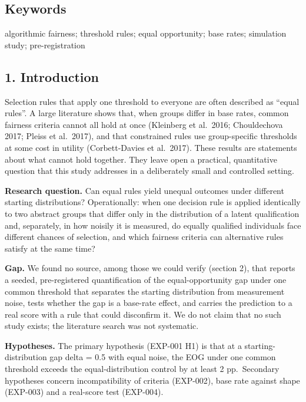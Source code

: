 \documentclass[
]{article}
\begin{document}
\subsection{Keywords}\label{keywords}

algorithmic fairness; threshold rules; equal opportunity; base rates;
simulation study; pre-registration

\subsection{1. Introduction}\label{introduction}

Selection rules that apply one threshold to everyone are often described
as ``equal rules''. A large literature shows that, when groups differ in
base rates, common fairness criteria cannot all hold at once (Kleinberg
et al.~2016; Chouldechova 2017; Pleiss et al.~2017), and that
constrained rules use group-specific thresholds at some cost in utility
(Corbett-Davies et al.~2017). These results are statements about what
cannot hold together. They leave open a practical, quantitative question
that this study addresses in a deliberately small and controlled
setting.

\textbf{Research question.} Can equal rules yield unequal outcomes under
different starting distributions? Operationally: when one decision rule
is applied identically to two abstract groups that differ only in the
distribution of a latent qualification and, separately, in how noisily
it is measured, do equally qualified individuals face different chances
of selection, and which fairness criteria can alternative rules satisfy
at the same time?

\textbf{Gap.} We found no source, among those we could verify (section
2), that reports a seeded, pre-registered quantification of the
equal-opportunity gap under one common threshold that separates the
starting distribution from measurement noise, tests whether the gap is a
base-rate effect, and carries the prediction to a real score with a rule
that could disconfirm it. We do not claim that no such study exists; the
literature search was not systematic.

\textbf{Hypotheses.} The primary hypothesis (EXP-001 H1) is that at a
starting-distribution gap delta = 0.5 with equal noise, the EOG under
one common threshold exceeds the equal-distribution control by at least
2 pp.~Secondary hypotheses concern incompatibility of criteria
(EXP-002), base rate against shape (EXP-003) and a real-score test
(EXP-004).
\end{document}
